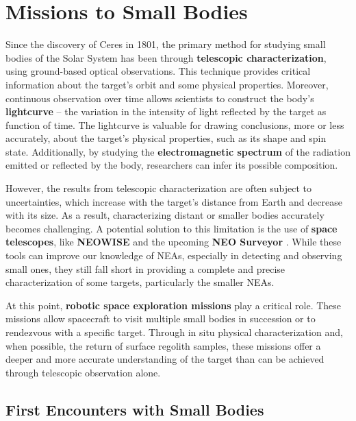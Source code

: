 \documentclass{Configuration_gigi/PoliMi3i_thesis}
\begin{document}
\chapter{Missions to Small Bodies}\label{Ch:Missions to Small Bodies}

Since the discovery of Ceres in 1801, the primary method for studying small bodies of the Solar System has been through \textbf{telescopic characterization}, using ground-based optical observations. This technique provides critical information about the target's orbit and some physical properties. Moreover, continuous observation over time allows scientists to construct the body's \textbf{lightcurve} -- the variation in the intensity of light reflected by the target as function of time. The lightcurve is valuable for drawing conclusions, more or less accurately, about the target's physical properties, such as its shape and spin state. Additionally, by studying the \textbf{electromagnetic spectrum} of the radiation emitted or reflected by the body, researchers can infer its possible composition. 

However, the results from telescopic characterization are often subject to uncertainties, which increase with the target's distance from Earth and decrease with its size. As a result, characterizing distant or smaller bodies accurately becomes challenging. A potential solution to this limitation is the use of \textbf{space telescopes}, like \textbf{NEOWISE} \cite{neowise} and the upcoming \textbf{NEO Surveyor} \cite{neosurveyor}. While these tools can improve our knowledge of NEAs, especially in detecting and observing small ones, they still fall short in providing a complete and precise characterization of some targets, particularly the smaller NEAs.

At this point, \textbf{robotic space exploration missions} play a critical role. These missions allow spacecraft to visit multiple small bodies in succession or to rendezvous with a specific target. Through in situ physical characterization and, when possible, the return of surface regolith samples, these missions offer a deeper and more accurate understanding of the target than can be achieved through telescopic observation alone.


\section{First Encounters with Small Bodies}\label{Sec:First Encounters with Small Bodies}
\end{document}
